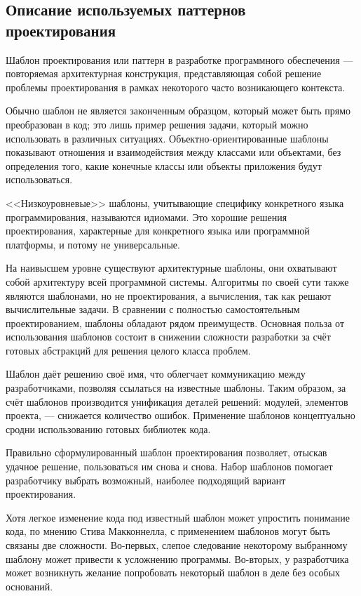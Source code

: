 \subsection{Описание используемых паттернов проектирования}
\label{sec:modeling:patterns}

Шаблон проектирования или паттерн в разработке программного обеспечения — повторяемая архитектурная конструкция, представляющая собой решение проблемы проектирования в рамках некоторого часто возникающего контекста.

Обычно шаблон не является законченным образцом, который может быть прямо преобразован в код; это лишь пример решения задачи, который можно использовать в различных ситуациях. Объектно-ориентированные шаблоны показывают отношения и взаимодействия между классами или объектами, без определения того, какие конечные классы или объекты приложения будут использоваться.

<<Низкоуровневые>> шаблоны, учитывающие специфику конкретного языка программирования, называются идиомами. Это хорошие решения проектирования, характерные для конкретного языка или программной платформы, и потому не универсальные.

На наивысшем уровне существуют архитектурные шаблоны, они охватывают собой архитектуру всей программной системы. Алгоритмы по своей сути также являются шаблонами, но не проектирования, а вычисления, так как решают вычислительные задачи. В сравнении с полностью самостоятельным проектированием, шаблоны обладают рядом преимуществ. Основная польза от использования шаблонов состоит в снижении сложности разработки за счёт готовых абстракций для решения целого класса проблем. 

Шаблон даёт решению своё имя, что облегчает коммуникацию между разработчиками, позволяя ссылаться на известные шаблоны. Таким образом, за счёт шаблонов производится унификация деталей решений: модулей, элементов проекта, — снижается количество ошибок. Применение шаблонов концептуально сродни использованию готовых библиотек кода.

Правильно сформулированный шаблон проектирования позволяет, отыскав удачное решение, пользоваться им снова и снова. Набор шаблонов помогает разработчику выбрать возможный, наиболее подходящий вариант проектирования. 

Хотя легкое изменение кода под известный шаблон может упростить понимание кода, по мнению Стива Макконнелла, с применением шаблонов могут быть связаны две сложности. Во-первых, слепое следование некоторому выбранному шаблону может привести к усложнению программы. Во-вторых, у разработчика может возникнуть желание попробовать некоторый шаблон в деле без особых оснований. 

